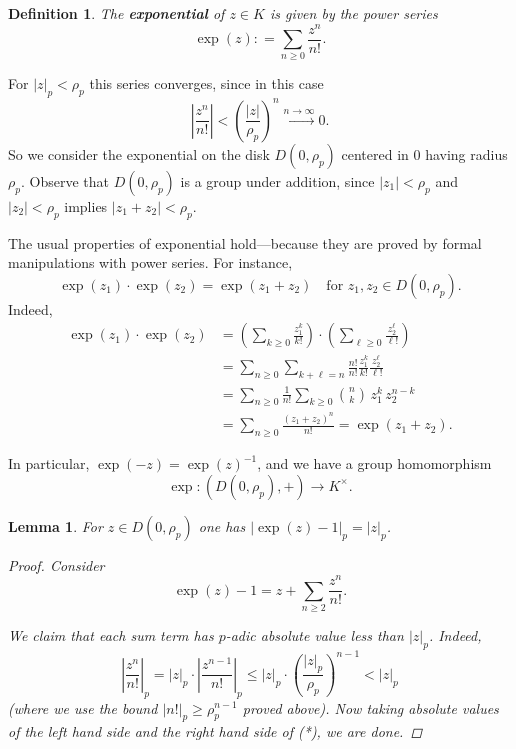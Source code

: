 \documentclass{article}
\newcommand{\term}{\textbf}
\newcommand{\dfn}{\mathrel{\mathop:}=}
\theoremstyle{myplain}
\newtheorem{lemma}[proposition]{Lemma}
\theoremstyle{mydefinition}
\newtheorem{definition}[proposition]{Definition}
\begin{document}
\begin{definition}
  The \term{exponential} of $z \in K$ is given by the power series
  $$\exp (z) \dfn \sum_{n \ge 0} \frac{z^n}{n!}.$$
\end{definition}

For $|z|_p < \rho_p$ this series converges, since in this case
$$\left|\frac{z^n}{n!}\right| < \left(\frac{|z|}{\rho_p}\right)^n \xrightarrow{n\to\infty} 0.$$
So we consider the exponential on the disk $D (0, \rho_p)$ centered in $0$
having radius $\rho_p$. Observe that $D (0, \rho_p)$ is a group under addition,
since $|z_1| < \rho_p$ and $|z_2| < \rho_p$ implies $|z_1+z_2| < \rho_p$.

The usual properties of exponential hold---because they are proved by formal
manipulations with power series. For instance,
$$\exp (z_1) \cdot \exp (z_2) = \exp (z_1+z_2) \quad \text{for }z_1, z_2 \in D (0,\rho_p).$$
Indeed,
\begin{align*}
  \exp (z_1) \cdot \exp (z_2) & = \left(\sum_{k \ge 0} \frac{z_1^k}{k!}\right) \cdot \left(\sum_{\ell \ge 0} \frac{z_2^\ell}{\ell!}\right)\\
                              & = \sum_{n \ge 0} \sum_{k+\ell = n} \frac{n!}{n!} \frac{z_1^k}{k!} \frac{z_2^\ell}{\ell!} \\
                              & = \sum_{n \ge 0} \frac{1}{n!} \sum_{k \ge 0} {n \choose k} \, z_1^k \, z_2^{n-k} \\
                              & = \sum_{n \ge 0} \frac{(z_1+z_2)^n}{n!} = \exp (z_1+z_2).
\end{align*}

In particular, $\exp (-z) = \exp (z)^{-1}$, and we have a group homomorphism
$$\exp\colon (D (0,\rho_p), +) \to K^\times.$$

\begin{lemma}
  For $z \in D (0,\rho_p)$ one has $|\exp (z) - 1|_p = |z|_p$.

  \begin{proof}
    Consider
    \[ \tag{*} \exp (z) - 1 = z + \sum_{n \ge 2} \frac{z^n}{n!}. \]

    We claim that each sum term has $p$-adic absolute value less than
    $|z|_p$. Indeed,
    \[ \left|\frac{z^n}{n!}\right|_p =
      |z|_p \cdot \left|\frac{z^{n-1}}{n!}\right|_p \le
      |z|_p \cdot \left(\frac{|z|_p}{\rho_p}\right)^{n-1} < |z|_p \]
    (where we use the bound $|n!|_p \ge \rho_p^{n-1}$ proved above). Now taking
    absolute values of the left hand side and the right hand side of (*), we are
    done.
  \end{proof}
\end{lemma}
\end{document}
